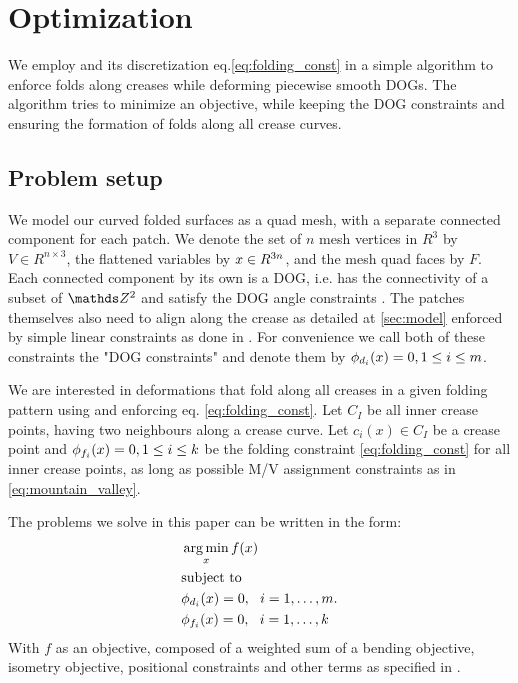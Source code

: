 \section{Optimization} \label{sec:implementation}
We employ  and its discretization eq.\eqref{eq:folding_const} in a simple algorithm to enforce folds along creases while deforming piecewise smooth DOGs. The algorithm tries to minimize an objective, while keeping the DOG constraints and ensuring the formation of folds along all crease curves.

\subsection{Problem setup}
We model our curved folded surfaces as a quad mesh, with a separate connected component for each patch. We denote the set of $n$ mesh vertices in $R^3$ by $V \in R^{n\times3}$, the flattened variables by $x \in R^{3n}$, and the mesh quad faces by $F$. Each connected component by its own is a DOG, i.e. has the connectivity of a subset of $\Z^2$ and satisfy the DOG angle constraints \cite{rabi18}. The patches themselves also need to align along the crease as detailed at \ref{sec:model} enforced by simple linear constraints as done in \cite{rabi2018shape}. For convenience we call both of these constraints the "DOG constraints" and denote them by $\phi_{d_i}(x) = 0, 1 \leq i \leq m$.

We are interested in deformations that fold along all creases in a given folding pattern using  and enforcing eq. \eqref{eq:folding_const}. Let $C_{I}$ be all inner crease points, having two neighbours along a crease curve. Let $c_i(x) \in C_{I}$ be a crease point and $\phi_{f_i}(x) = 0, 1 \leq i \leq k$ be the folding constraint \eqref{eq:folding_const} for all inner crease points, as long as possible M/V assignment constraints as in \eqref{eq:mountain_valley}.

The problems we solve in this paper can be written in the form:
\begin{equation} \label{eq:const_opt}
\begin{aligned}
& \operatorname*{arg\,min}_x f(x) \\
& \textrm{subject to} \\
& \phi_{d_i}(x) = 0, \ \  i = 1, \ldots, m. \\
& \phi_{f_i}(x) = 0, \ \  i = 1, \ldots, k \\ 
\end{aligned}
\end{equation}
With $f$ as an objective, composed of a weighted sum of a bending objective, isometry objective, positional constraints and other terms as specified in .

